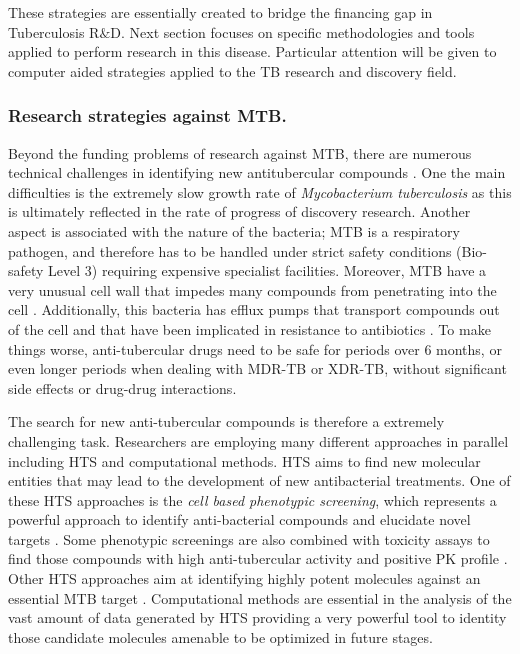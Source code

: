 \documentclass[11pt, b5paper,twoside]{tesi_upf}
\begin{document}
\par These strategies are essentially created to bridge the financing gap in Tuberculosis R$\&$D. Next section focuses on specific methodologies and tools applied to perform research in this disease. Particular attention will be given to computer aided strategies applied to the TB research and discovery field. 

\subsubsection{Research strategies against MTB.}\label{mtb_research}

\par Beyond the funding problems of research against MTB, there are numerous technical challenges in identifying new antitubercular compounds \cite{Zuniga2015}. One the main difficulties is the extremely slow growth rate of \textit{Mycobacterium tuberculosis} as this is ultimately reflected in the rate of progress of discovery research. Another aspect is associated with the nature of the bacteria; MTB is a respiratory pathogen, and therefore has to be handled under strict safety conditions (Bio-safety Level 3) requiring expensive specialist facilities. Moreover, MTB have a very unusual cell wall that impedes many compounds from penetrating into the cell \cite{Brennan2003}. Additionally, this bacteria has efflux pumps that transport compounds out of the cell and that have been implicated in resistance to antibiotics \cite{Rodrigues2012}. To make things worse, anti-tubercular drugs need to be safe for periods over 6 months, or even longer periods when dealing with MDR-TB or XDR-TB, without significant side effects or drug-drug interactions. 
\par The search for new anti-tubercular compounds is therefore a extremely challenging task. Researchers are employing many different approaches in parallel including HTS and computational methods. HTS aims to find new molecular entities that may lead to the development of new antibacterial treatments. One of these HTS approaches is the \textit{cell based phenotypic screening}, which represents a powerful approach to identify anti-bacterial compounds and elucidate novel targets \cite{Manjunatha2015}. Some phenotypic screenings are also combined with toxicity assays to find those compounds with high anti-tubercular activity and positive PK profile \cite{Ballell2013}. Other HTS approaches aim at identifying highly potent molecules against an essential MTB target \cite{Park2015, Arora2014}.  Computational methods are essential in the analysis of the vast amount of data generated by HTS providing a very powerful tool to identity those candidate molecules amenable to be optimized in future stages. 
\end{document}
